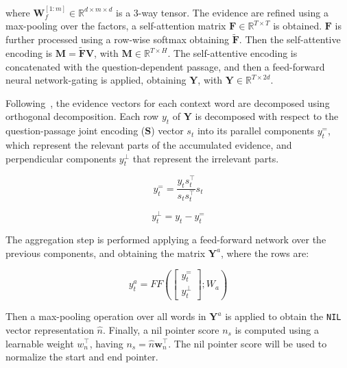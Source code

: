 \begin{itemize}[-]
    where $\mathbf{W}_{f}^{[1:m]} \in \mathbb{R} ^{d \times m \times d}$ is a 3-way tensor. The evidence are refined using a max-pooling over the factors, a self-attention matrix $\mathbf{F} \in \mathbb{R} ^{T  \times T}$ is obtained. $\mathbf{F}$ is further processed using a row-wise softmax obtaining $\mathbf{\tilde{F}}$. Then the self-attentive encoding is $\mathbf{M} = \mathbf{\tilde{F}}\mathbf{V}$, with $\mathbf{M} \in \mathbb{R} ^{T \times H}$. The self-attentive encoding is concatenated with the question-dependent passage, and then a feed-forward neural network-gating is applied, obtaining $\mathbf{Y}$, with $\mathbf{Y} \in \mathbb{R}^{T \times 2d}$.
    
    
    Following~\citep{wang-etal-2016-sentence}, the evidence vectors for each context word are decomposed using orthogonal decomposition. Each row $y_t$ of $\mathbf{Y}$ is decomposed with respect to the question-passage joint encoding ($\mathbf{S}$) vector $s_t$ into its parallel components $y_{t}^{=}$, which represent the relevant parts of the accumulated evidence, and perpendicular components $y_{t}^{\perp}$ that represent the irrelevant parts.
    
    \begin{equation}
        y_{t}^{=}=\frac{y_{t} s_{t}^{\top}}{s_{t} s_{t}^{\top}}s_{t}
    \end{equation}
    
    \begin{equation}
        y_{t}^{\perp}=y_{t}-y_{t}^{=}
    \end{equation}
    
    The aggregation step is performed applying a feed-forward network over the previous components, and obtaining the matrix $\mathbf{Y}^a$, where the rows are:
    
    \begin{equation}
        y_{t}^{a} = FF\left(\begin{bmatrix}
           y_{t}^{=} \\
           y_{t}^{\perp}
         \end{bmatrix}; W_a\right)
    \end{equation}
    
    Then a max-pooling operation over all words in $\mathbf{Y}^a$ is applied to obtain the \texttt{NIL} vector representation $\hat{n}$. Finally, a nil pointer score $n_s$ is computed using a learnable weight $w_{n}^{\intercal}$, having $n_s = \hat{n}\textbf{w}_{n}^{\intercal}$. The nil pointer score will be used to normalize the start and end pointer.
    
\end{itemize}

